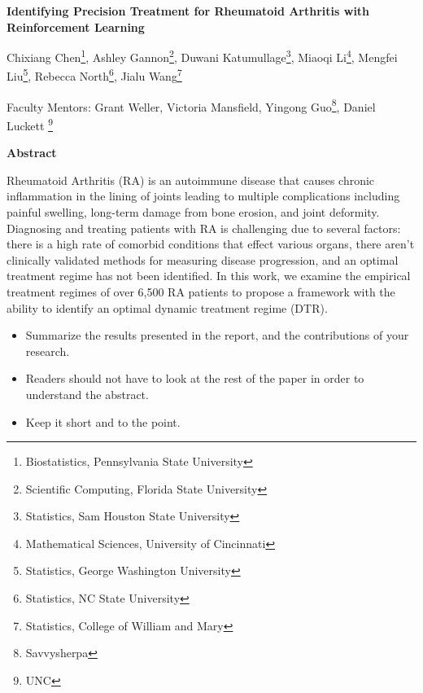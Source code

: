 \documentclass[10pt]{article}
\begin{document}
\centerline{\large \bf Identifying Precision Treatment for Rheumatoid Arthritis with Reinforcement Learning}

\vspace{.1truein}

\def\thefootnote{\arabic{footnote}}
\begin{center}
  Chixiang Chen\footnote{Biostatistics, Pennsylvania State University},
  Ashley Gannon\footnote{Scientific Computing, Florida State University},
  Duwani Katumullage\footnote{Statistics, Sam Houston State University},
  Miaoqi Li\footnote{Mathematical Sciences, University of Cincinnati},
  Mengfei Liu\footnote{Statistics, George Washington University},
  Rebecca North\footnote{Statistics, NC State University},
  Jialu Wang\footnote{Statistics, College of William and Mary}
\end{center}


\begin{center}
Faculty Mentors: Grant Weller, Victoria Mansfield, Yingong Guo\footnote{Savvysherpa},
Daniel Luckett \footnote{UNC}
\end{center}

\vspace{.3truein}
\centerline{\bf Abstract}

Rheumatoid Arthritis (RA) is an autoimmune disease that causes chronic inflammation in the lining of joints leading to multiple complications including painful swelling, long-term damage from bone erosion, and joint deformity. Diagnosing and treating patients with RA is challenging due to several factors: there is a high rate of comorbid conditions that effect various organs, there aren't clinically validated methods for measuring disease progression, and an optimal treatment regime has not been identified. In this work, we examine the empirical treatment regimes of over 6,500 RA patients to propose a framework with the ability to identify an optimal dynamic treatment regime (DTR). 

\begin{itemize}
\item Summarize the results presented in the report, and the contributions
of your research.

\item Readers should not have to look at the rest of the paper in order to 
understand the abstract.

\item Keep it short and to the point.
\end{itemize}
\end{document}
